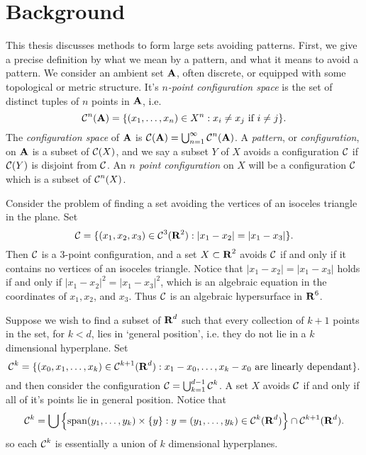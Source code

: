 
\chapter{Background}
\label{ch:Background}

This thesis discusses methods to form large sets avoiding patterns. First, we give a precise definition by what we mean by a pattern, and what it means to avoid a pattern. We consider an ambient set $\operatorname{\mathbf{A}}$, often discrete, or equipped with some topological or metric structure. It's {\it $n$-point configuration space} is the set of distinct tuples of $n$ points in $\operatorname{\mathbf{A}}$, i.e.
%
\[ \operatorname{\mathcal{C}}^n(\operatorname{\mathbf{A}}) = \{ (x_1, \dots, x_n) \in X^n: x_i \neq x_j\ \text{if $i \neq j$} \}. \]
%
The {\it configuration space} of $\operatorname{\mathbf{A}}$ is $\operatorname{\mathcal{C}}(\operatorname{\mathbf{A}}) = \bigcup_{n = 1}^\infty \operatorname{\mathcal{C}}^n(\operatorname{\mathbf{A}})$. A {\it pattern}, or {\it configuration}, on $\operatorname{\mathbf{A}}$ is a subset of $\operatorname{\mathcal{C}}(X)$, and we say a subset $Y$ of $X$ avoids a configuration $\operatorname{\mathcal{C}}$ if $\operatorname{\mathcal{C}}(Y)$ is disjoint from $\operatorname{\mathcal{C}}$. An {\it $n$ point configuration} on $X$ will be a configuration $\operatorname{\mathcal{C}}$ which is a subset of $\operatorname{\mathcal{C}}^n(X)$.

\begin{example}
	Consider the problem of finding a set avoiding the vertices of an isoceles triangle in the plane. Set
	\[ \operatorname{\mathcal{C}} = \{ (x_1, x_2, x_3) \in \operatorname{\mathcal{C}}^3(\operatorname{\mathbf{R}}^2) : |x_1-x_2| = |x_1-x_3| \}. \]
	Then $\operatorname{\mathcal{C}}$ is a 3-point configuration, and a set $X \subset \operatorname{\mathbf{R}}^2$ avoids $\operatorname{\mathcal{C}}$ if and only if it contains no vertices of an isoceles triangle. Notice that $|x_1 - x_2| = |x_1 - x_3|$ holds if and only if $|x_1 - x_2|^2 = |x_1 - x_3|^2$, which is an algebraic equation in the coordinates of $x_1,x_2$, and $x_3$. Thus $\operatorname{\mathcal{C}}$ is an algebraic hypersurface in $\operatorname{\mathbf{R}}^6$.
\end{example}

\begin{example}
	Suppose we wish to find a subset of $\operatorname{\mathbf{R}}^d$ such that every collection of $k+1$ points in the set, for $k < d$, lies in `general position', i.e. they do not lie in a $k$ dimensional hyperplane. Set
	\[ \C^k = \{ (x_0, x_1, \dots, x_k) \in \Config^{k+1}(\RR^d): x_1-x_0, \dots, x_k - x_0\ \text{are linearly dependant} \}. \]
	and then consider the configuration $\operatorname{\mathcal{C}} = \bigcup_{k = 1}^{d-1} \operatorname{\mathcal{C}}^k$. A set $X$ avoids $\operatorname{\mathcal{C}}$ if and only if all of it's points lie in general position. Notice that
	\[ \operatorname{\mathcal{C}}^k = \bigcup \left\{ \text{span}(y_1, \dots, y_k) \times \{ y \} : y = (y_1, \dots, y_k) \in \operatorname{\mathcal{C}}^k(\operatorname{\mathbf{R}}^d) \right\} \cap \operatorname{\mathcal{C}}^{k+1}(\operatorname{\mathbf{R}}^d). \]
	so each $\operatorname{\mathcal{C}}^k$ is essentially a union of $k$ dimensional hyperplanes.
\end{example}

